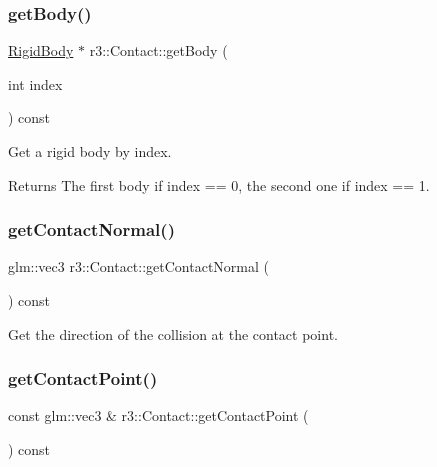\mbox{\label{classr3_1_1_contact_aaa7c4c676fd8f3b07f81cc18257c48d9}} 
\subsubsection{\texorpdfstring{get\+Body()}{getBody()}}
{\footnotesize\ttfamily \mbox{\hyperlink{classr3_1_1_rigid_body}{Rigid\+Body}} $\ast$ r3\+::\+Contact\+::get\+Body (\begin{DoxyParamCaption}\item[{int}]{index }\end{DoxyParamCaption}) const}

Get a rigid body by index. \begin{DoxyReturn}{Returns}
The first body if index == 0, the second one if index == 1. 
\end{DoxyReturn}
\mbox{\label{classr3_1_1_contact_a2d8f594947a1900fd21e2f707384d9fe}} 
\subsubsection{\texorpdfstring{get\+Contact\+Normal()}{getContactNormal()}}
{\footnotesize\ttfamily glm\+::vec3 r3\+::\+Contact\+::get\+Contact\+Normal (\begin{DoxyParamCaption}{ }\end{DoxyParamCaption}) const}

Get the direction of the collision at the contact point. \mbox{\label{classr3_1_1_contact_a9558ff3dd4e2c5331fc05076e4e503a0}} 
\subsubsection{\texorpdfstring{get\+Contact\+Point()}{getContactPoint()}}
{\footnotesize\ttfamily const glm\+::vec3 \& r3\+::\+Contact\+::get\+Contact\+Point (\begin{DoxyParamCaption}{ }\end{DoxyParamCaption}) const}

